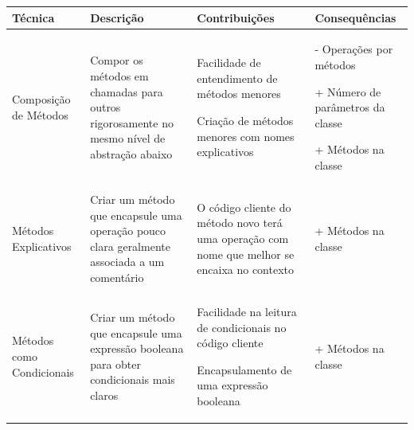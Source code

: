 \begin{landscape}

\begin{table}[hbt]

\begin{tabular}{|p{3.5cm}|p{5cm}|p{8.5cm}|p{7.2cm}|}
\hline 
\textbf{Técnica} & \textbf{Descrição} & \textbf{Contribuições} & \textbf{Consequências} \tabularnewline
\hline

\hline 
Composição de Métodos 
& Compor os métodos em chamadas para outros rigorosamente no mesmo nível de abstração abaixo
& \begin{my_itemize}
	\item Facilidade de entendimento de métodos menores
	\item Criação de métodos menores com nomes explicativos
  \end{my_itemize}
& \begin{my_itemize}
	\item[-] Operações por métodos
	\item[+] Número de parâmetros da classe
	\item[+] Métodos na classe
  \end{my_itemize}
\tabularnewline

\hline 
Métodos Explicativos
& Criar um método que encapsule uma operação pouco clara geralmente associada a um comentário
& \begin{my_itemize}
	\item O código cliente do método novo terá uma operação com nome que melhor se encaixa no contexto
  \end{my_itemize}
& \begin{my_itemize}
	\item[+] Métodos na classe
  \end{my_itemize}
\tabularnewline

\hline 
Métodos como Condicionais
& Criar um método que encapsule uma expressão booleana para obter condicionais mais claros
& \begin{my_itemize}
	\item Facilidade na leitura de condicionais no código cliente
	\item Encapsulamento de uma expressão booleana	
  \end{my_itemize}
& \begin{my_itemize}
	\item[+] Métodos na classe
  \end{my_itemize}
\tabularnewline


\end{tabular}
\end{table}
\end{landscape}
